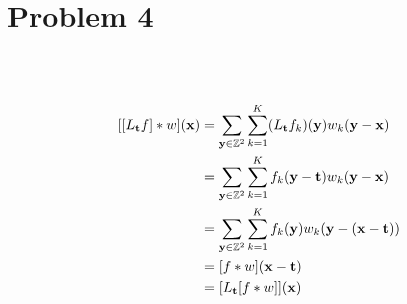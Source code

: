 \section{Problem 4}~\label{sec:prob4}

\subsection{} %

\begin{equation}
\begin{split}
[[L_\bt f] * w](\bx)
    & = \sum_{\by\in \zz^2}\sum_{k=1}^K (L_\bt f_k)(\by) w_k(\by-\bx)  \\
    & = \sum_{\by\in \zz^2}\sum_{k=1}^K f_k(\by-\bt) w_k(\by-\bx)  \\
    & = \sum_{\by\in \zz^2}\sum_{k=1}^K f_k(\by) w_k(\by-(\bx-\bt))  \\
    & = [ f * w](\bx-\bt) \\
    & = [L_\bt[ f * w]](\bx)
\end{split}
\end{equation}

\subsection{} %
